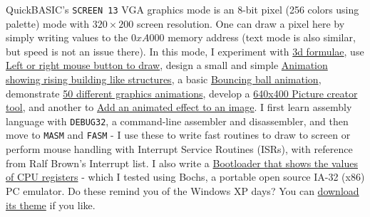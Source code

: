 QuickBASIC's \verb|SCREEN 13| VGA graphics mode is an 8-bit pixel (256 colors using palette) mode with $320\times200$ screen resolution. One can draw a pixel here by simply writing values to the $0xA000$ memory address (text mode is also similar, but speed is not an issue there). In this mode, I experiment with \href{https://github.com/qb40/3d-experiment}{3d formulae}, use \href{https://github.com/qb40/fun-with-mouse}{Left or right mouse button to draw}, design a small and simple \href{https://github.com/qb40/building-animation}{Animation showing rising building like structures}, a basic \href{https://github.com/qb40/ball-animation}{Bouncing ball animation}, demonstrate \href{https://github.com/qb40/designs}{50 different graphics animations}, develop a \href{https://github.com/qb40/picture-creator}{640x400 Picture creator tool}, and another to \href{https://github.com/qb40/image-effect}{Add an animated effect to an image}. I first learn assembly language with \verb|DEBUG32|, a command-line assembler and disassembler, and then move to \verb|MASM| and \verb|FASM| - I use these to write fast routines to draw to screen or perform mouse handling with Interrupt Service Routines (ISRs), with reference from Ralf Brown's Interrupt list. I also write a \href{https://github.com/qb40/boot-register-view}{Bootloader that shows the values of CPU registers} - which I tested using Bochs, a portable open source IA-32 (x86) PC emulator. Do these remind you of the Windows XP days? You can \href{https://github.com/themepackf/windows-xp}{download its theme} if you like.

